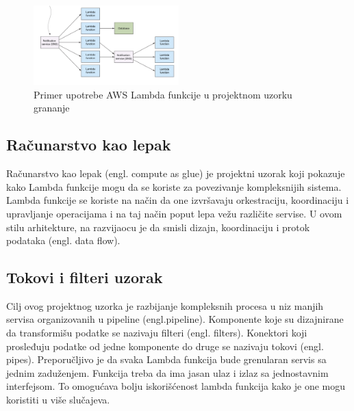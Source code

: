 \documentclass[12pt,oneside]{memoir}
\begin{document}
\begin{figure}[!ht]
  \centering
  \includegraphics[width=0.5\textwidth]{Slika 15.png}
  \caption{Primer upotrebe AWS Lambda funkcije u projektnom uzorku grananje}
  \label{fig:grananje}
\end{figure}

\subsection{Računarstvo kao lepak} %
Računarstvo kao lepak (engl. compute as glue) je projektni uzorak koji pokazuje kako Lambda funkcije mogu da se koriste za povezivanje kompleksnijih sistema. Lambda funkcije se koriste na način da one izvršavaju orkestraciju, koordinaciju i upravljanje operacijama i na taj način poput lepa vežu različite servise. U ovom stilu arhitekture, na razvijaocu je da smisli dizajn, koordinaciju i protok podataka (engl. data flow). 
 
\subsection{Tokovi i filteri uzorak}
Cilj ovog projektnog uzorka je razbijanje kompleksnih procesa u niz manjih servisa organizovanih u pipeline (engl.pipeline). Komponente koje su dizajnirane da transformišu podatke se nazivaju filteri (engl. filters). Konektori koji prosleđuju podatke od jedne komponente do druge se nazivaju tokovi (engl. pipes). Preporučljivo je da svaka Lambda funkcija bude grenularan servis sa jednim zaduženjem. Funkcija treba da ima jasan ulaz i izlaz sa jednostavnim interfejsom. To omogućava bolju iskorišćenost lambda funkcija kako je one mogu koristiti u više slučajeva.

\end{document}
